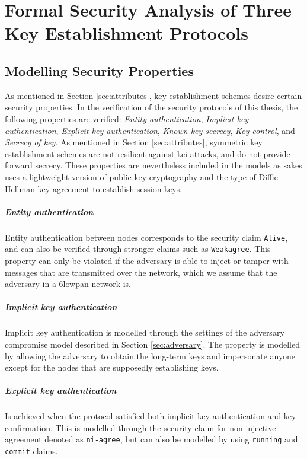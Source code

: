 \chapter{Formal Security Analysis of Three Key Establishment Protocols}
\label{chp:analysis}


\section{Modelling Security Properties}

As mentioned in Section \ref{sec:attributes}, key establishment schemes desire certain security properties. In the verification of the security protocols of this thesis, the following properties are verified: \emph{Entity authentication}, \emph{Implicit key authentication}, \emph{Explicit key authentication}, \emph{Known-key secrecy}, \emph{Key control}, and \emph{Secrecy of key}. As mentioned in Section \ref{sec:attributes}, symmetric key establishment schemes are not resilient against \gls{kci} attacks, and do not provide forward secrecy. These properties are nevertheless included in the models as \gls{sakes} uses a lightweight version of public-key cryptography and the type of Diffie-Hellman key agreement to establish session keys.

\paragraph{Entity authentication} Entity authentication between nodes corresponds to the security claim \texttt{Alive}, and can also be verified through stronger claims such as \texttt{Weakagree}. This property can only be violated if the adversary is able to inject or tamper with messages that are transmitted over the network, which we assume that the adversary in a \gls{6lowpan} network is.

\paragraph{Implicit key authentication} Implicit key authentication is modelled through the settings of the adversary compromise model described in Section \ref{sec:adversary}. The property is modelled by allowing the adversary to obtain the long-term keys and impersonate anyone except for the nodes that are supposedly establishing keys.

\paragraph{Explicit key authentication} Is achieved when the protocol satisfied both implicit key authentication and key confirmation. This is modelled through the security claim for non-injective agreement denoted as \texttt{ni-agree}, but can also be modelled by using \texttt{running} and \texttt{commit} claims.

